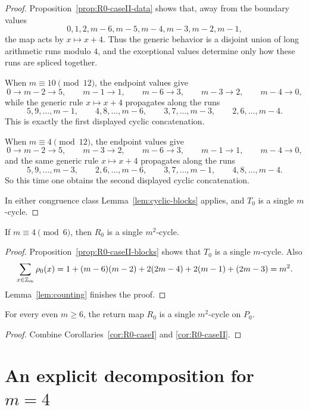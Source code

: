 \begin{proof}
Proposition~\ref{prop:R0-caseII-data} shows that, away from the boundary values
\[
0,1,2,m-6,m-5,m-4,m-3,m-2,m-1,
\]
the map acts by $x\mapsto x+4$.
Thus the generic behavior is a disjoint union of long arithmetic runs modulo $4$, and the exceptional values determine only how these runs are spliced together.

When $m\equiv 10\pmod{12}$, the endpoint values give
\[
0\to m-2\to 5,\qquad m-1\to 1,\qquad m-6\to 3,\qquad m-3\to 2,\qquad m-4\to 0,
\]
while the generic rule $x\mapsto x+4$ propagates along the runs
\[
5,9,\dots,m-1,\qquad 4,8,\dots,m-6,\qquad 3,7,\dots,m-3,\qquad 2,6,\dots,m-4.
\]
This is exactly the first displayed cyclic concatenation.

When $m\equiv 4\pmod{12}$, the endpoint values give
\[
0\to m-2\to 5,\qquad m-3\to 2,\qquad m-6\to 3,\qquad m-1\to 1,\qquad m-4\to 0,
\]
and the same generic rule $x\mapsto x+4$ propagates along the runs
\[
5,9,\dots,m-3,\qquad 2,6,\dots,m-6,\qquad 3,7,\dots,m-1,\qquad 4,8,\dots,m-4.
\]
So this time one obtains the second displayed cyclic concatenation.

In either congruence class Lemma~\ref{lem:cyclic-blocks} applies, and $T_0$ is a single $m$-cycle.
\end{proof}

\begin{corollary}\label{cor:R0-caseII}
If $m\equiv 4\pmod 6$, then $R_0$ is a single $m^2$-cycle.
\end{corollary}

\begin{proof}
Proposition~\ref{prop:R0-caseII-blocks} shows that $T_0$ is a single $m$-cycle.
Also
\[
\sum_{x\in \mathbb Z_m}\rho_0(x)=1+(m-6)(m-2)+2(2m-4)+2(m-1)+(2m-3)=m^2.
\]
Lemma~\ref{lem:counting} finishes the proof.
\end{proof}

\begin{corollary}\label{cor:R0-all}
For every even $m\ge 6$, the return map $R_0$ is a single $m^2$-cycle on $P_0$.
\end{corollary}

\begin{proof}
Combine Corollaries~\ref{cor:R0-caseI} and \ref{cor:R0-caseII}.
\end{proof}


\section{An explicit decomposition for $m=4$}\label{app:m4}

